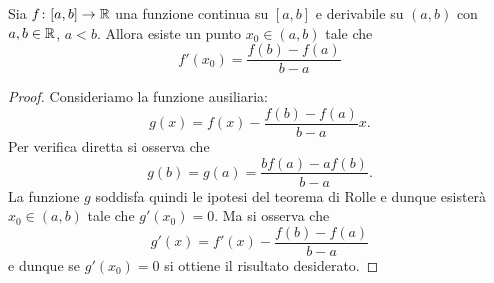 \begin{theorem}[Lagrange]\label{th:lagrange}%
\mymark{***}%
%
%
%
Sia $f\colon [a,b]\to {\mathbb R}$ una funzione continua su $[a,b]$ e derivabile su $(a,b)$
con $a,b\in {\mathbb R}$, $a<b$.
%
Allora esiste un punto $x_0\in (a,b)$ tale che
\[
  f'(x_0) = \frac{f(b) - f(a)}{b-a}
\]
\end{theorem}
%
\begin{proof}
\mymark{***}
Consideriamo la funzione ausiliaria:
\[
  g(x) = f(x) - \frac{f(b)-f(a)}{b-a} x.
\]
Per verifica diretta si osserva che
\[
  g(b) = g(a) = \frac{b f(a) - a f(b)}{b-a}.
\]
La funzione $g$ soddisfa quindi le ipotesi del teorema di Rolle e dunque esisterà $x_0\in (a,b)$ tale che $g'(x_0)=0$.
Ma si osserva che
\[
  g'(x) = f'(x) - \frac{f(b)-f(a)}{b-a}
\]
e dunque se $g'(x_0)=0$ si ottiene il risultato desiderato.
\end{proof}


